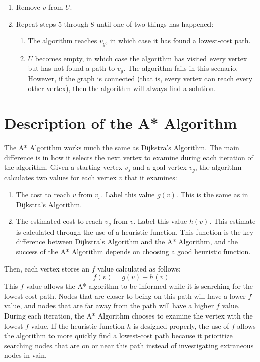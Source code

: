 \documentclass[conference]{IEEEtran}
\begin{document}
\begin{enumerate}
\begin{itemize}
    \end{itemize}

    \item Remove $v$ from $U$.

    \item Repeat steps 5 through 8 until one of two things has happened:

    \begin{enumerate}
        \item The algorithm reaches $v_g$, in which case it has found a lowest-cost path.

        \item $U$ becomes empty, in which case the algorithm has visited every vertex but has not found a path to $v_g$. The algorithm fails in this scenario. However, if the graph is connected (that is, every vertex can reach every other vertex), then the algorithm will always find a solution.
    \end{enumerate}

\end{enumerate}


\section{Description of the A* Algorithm}
The A* Algorithm works much the same as Dijkstra’s Algorithm. The main difference is in how it selects the next vertex to examine during each iteration of the algorithm. Given a starting vertex $v_s$ and a goal vertex $v_g$, the algorithm calculates two values for each vertex $v$ that it examines:
\begin{enumerate}
    \item The cost to reach $v$ from $v_s$. Label this value $g(v)$. This is the same as in Dijkstra’s Algorithm.

    \item The estimated cost to reach $v_g$ from $v$. Label this value $h(v)$. This estimate is calculated through the use of a heuristic function. This function is the key difference between Dijkstra’s Algorithm and the A* Algorithm, and the success of the A* Algorithm depends on choosing a good heuristic function.

\end{enumerate}

Then, each vertex stores an $f$ value calculated as follows:
\[f(v) = g(v) + h(v)\]
This $f$ value allows the A* algorithm to be informed while it is searching for the lowest-cost path. Nodes that are closer to being on this path will have a lower $f$ value, and nodes that are far away from the path will have a higher $f$ value.
\newline
\newline
During each iteration, the A* Algorithm chooses to examine the vertex with the lowest $f$ value. If the heuristic function $h$ is designed properly, the use of $f$ allows the algorithm to more quickly find a lowest-cost path because it prioritize searching nodes that are on or near this path instead of investigating extraneous nodes in vain.
\end{document}
